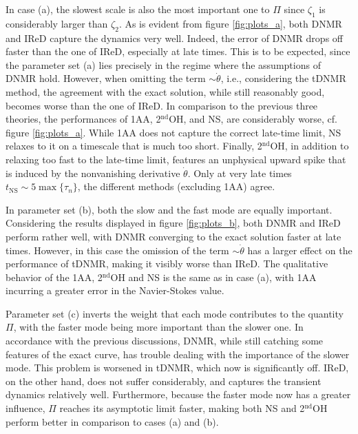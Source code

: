 \documentclass[a4paper, amsfonts, amssymb, amsmath, reprint, showkeys, nofootinbib, twoside, onecolumn,notitlepage]{revtex4-2}
\begin{document}
In case (a), the slowest scale is also the most important one to $\Pi$ since $\zeta_1$ is considerably larger than $\zeta_2$. As is evident from figure \ref{fig:plots_a}, both DNMR and IReD capture the dynamics very well. Indeed, the error of DNMR drops off faster than the one of IReD, especially at late times. This is to be expected, since the parameter set (a) lies precisely in the regime where the assumptions of DNMR hold. However, when omitting the term $\sim \dot{\theta}$, i.e., considering the tDNMR method, the agreement with the exact solution, while still reasonably good, becomes worse than the one of IReD. In comparison to the previous three theories, the performances of 1AA, 2$^{\mathrm{nd}}$OH, and NS, are considerably worse, cf. figure \ref{fig:plots_a}. While 1AA does not capture the correct late-time limit, NS relaxes to it on a timescale that is much too short. Finally, 2$^{\mathrm{nd}}$OH, in addition to relaxing too fast to the late-time limit, features an unphysical upward spike that is induced by the nonvanishing derivative $\dot{\theta}$. Only at very late times $t_{\mathrm{NS}}\sim 5 \max\{\tau_n\}$, the different methods (excluding 1AA) agree.
    
    In parameter set (b), both the slow and the fast mode are equally important. Considering the results displayed in figure \ref{fig:plots_b}, both DNMR and IReD perform rather well, with DNMR converging to the exact solution faster at late times. However, in this case the omission of the term $\sim\dot{\theta}$ has a larger effect on the performance of tDNMR, making it visibly worse than IReD. The qualitative behavior of the 1AA, 2$^{\mathrm{nd}}$OH and NS is the same as in case (a), with 1AA incurring a greater error in the Navier-Stokes value. 
    
    Parameter set (c) inverts the weight that each mode contributes to the quantity $\Pi$, with the faster mode being more important than the slower one. In accordance with the previous discussions, DNMR, while still catching some features of the exact curve, has trouble dealing with the importance of the slower mode. This problem is worsened in tDNMR, which now is significantly off. IReD, on the other hand, does not suffer considerably, and captures the transient dynamics relatively well. Furthermore, because the faster mode now has a greater influence, $\Pi$ reaches its asymptotic limit faster, making both NS and 2$^{\mathrm{nd}}$OH perform better in comparison to cases (a) and (b).
\end{document}
